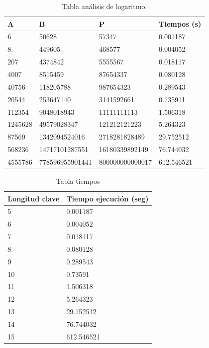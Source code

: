 \begin{table}[htbp]
	\begin{center}
		\begin{tabular}{|l|l|l|l|}
			A & B & P & Tiempos (s) \\ \hline
			6 & 50628 & 57347 & 0.001187 \\ \hline 
			8 & 449605 & 468577 & 0.004052 \\ \hline
			207 & 4374842 & 5555567 & 0.018117 \\ \hline
			4007 & 8515459 & 87654337 & 0.080128\\ \hline
			40756 & 118205788 & 987654323 & 0.289543\\ \hline
			20544 & 253647140 & 3141592661 & 0.735911\\ \hline
			112354 & 9048018943 & 11111111113 & 1.506318\\ \hline
			1245628 & 49579028347 & 121212121223 & 5.264323\\ \hline
			87569 & 1342094524016 & 2718281828489 & 29.752512\\ \hline
			568236 & 14717101287551 & 16180339892149 & 76.744032\\ \hline
			4555786 & 778596955901441 & 800000000000017 & 612.546521\\ \hline
		\end{tabular}
		\caption{Tabla análisis de logaritmo.}
		\label{tabla:compleja}
	\end{center}
\end{table}

\begin{table}[htbp]
	\begin{center}
		\begin{tabular}{|l|l|}
			Longitud clave & Tiempo ejecución (seg) \\ \hline
			5 & 0.001187 \\ \hline 
			6 & 0.004052 \\ \hline
			7 & 0.018117 \\ \hline
			8 & 0.080128\\ \hline
			9 & 0.289543\\ \hline
			10 & 0.73591\\ \hline
			11 & 1.506318\\ \hline
			12 & 5.264323\\ \hline
			13 & 29.752512\\ \hline
			14 & 76.744032 \\ \hline
			15 & 612.546521\\ \hline
		\end{tabular}
		\caption{Tabla tiempos}
		\label{tabla:resumen}
	\end{center}
\end{table}


